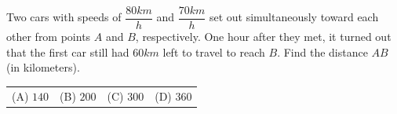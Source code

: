 Two cars with speeds of $\dfrac{80km}{h}$ and $\dfrac{70km}{h}$ set out simultaneously toward each other from points $A$ and $B$, respectively. One hour after they met, it turned out that the first car still had $60km$ left to travel to reach $B$. Find the distance $AB$ (in kilometers).



\begin{tabular}{llll}
(A) $140$ & (B) $200$ & (C) $300$ & (D) $360$
\end{tabular}
